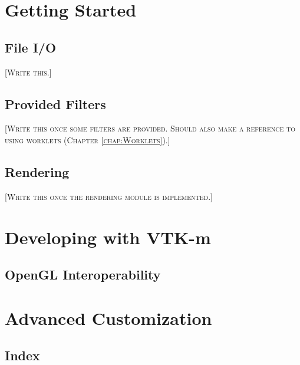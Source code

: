 \documentclass{InsightSoftwareGuide}
\newcommand{\fix}[1]{{\color{red}\textsc{[#1]}}}
\begin{document}
\sloppy

\frontmatter
\pagestyle{empty}
\titleGM

\clearpage


\pagestyle{fancy}
{\small
\tableofcontents
\listoffigures
\lstlistoflistings
}

\mainmatter

\part{Getting Started}



\chapter{File I/O}
\label{chap:FileIO}

\fix{Write this.}

\chapter{Provided Filters}
\label{chap:ProvidedFilters}

\fix{Write this once some filters are provided. Should also make a
  reference to using worklets (Chapter \ref{chap:Worklets}).}

\chapter{Rendering}
\label{chap:Rendering}

\fix{Write this once the rendering module is implemented.}

\part{Developing with VTK-m}









\chapter{OpenGL Interoperability}
\label{chap:OpenGLInteroperability}

\part{Advanced Customization}





\backmatter
\chapter{Index}
{\small
\printindex
}
\end{document}
